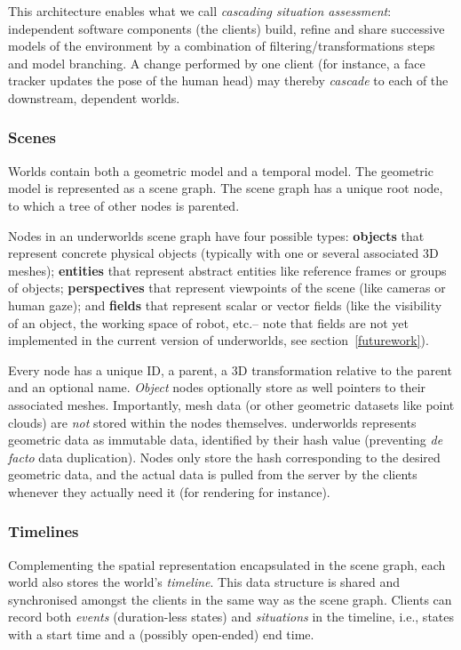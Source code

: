\documentclass[letterpaper, 10pt, conference]{ieeeconf}
\newcommand{\ie}{i.e.,\xspace}
\newcommand{\etc}{etc.\xspace}
\newcommand{\uwds}{{\sc underworlds}\xspace}
\begin{document}
This architecture enables what we call \emph{cascading situation assessment}:
independent software components (the clients) build, refine and share
successive models of the environment by a combination of
filtering/transformations steps and model branching. A change performed by one
client (for instance, a face tracker updates the pose of the human head) may
thereby \emph{cascade} to each of the downstream, dependent worlds.

\subsubsection{Scenes}

Worlds contain both a geometric model and a temporal model. The geometric
model is represented as a scene graph. The scene graph has a unique root node,
to which a tree of other nodes is parented.

Nodes in an \uwds scene graph have four possible types: \textbf{objects} that
represent concrete physical objects (typically with one or several associated 3D
meshes); \textbf{entities} that represent abstract entities like reference
frames or groups of objects; \textbf{perspectives} that represent viewpoints
of the scene (like cameras or human gaze); and \textbf{fields} that represent
scalar or vector fields (like the visibility of an object, the working space of
robot, \etc -- note that fields are not yet implemented in the current version
of \uwds, see section~\ref{futurework}).

Every node has a unique ID, a parent, a 3D transformation relative to the parent
and an optional name. \emph{Object} nodes optionally store as well pointers to
their associated meshes. Importantly, mesh data (or other geometric datasets
like point clouds) are \emph{not} stored within the nodes themselves. \uwds
represents geometric data as immutable data, identified by their hash value
(preventing \textit{de facto} data duplication).  Nodes only store the hash
corresponding to the desired geometric data, and the actual data is pulled from
the server by the clients whenever they actually need it (for rendering for
instance).

\subsubsection{Timelines}

Complementing the spatial representation encapsulated in the scene graph, each
world also stores the world's \emph{timeline}. This data structure is shared
and synchronised amongst the clients in the same way as the scene graph.
Clients can record both \emph{events} (duration-less states) and
\emph{situations} in the timeline, \ie states with a start time and a (possibly open-ended) end time.
\end{document}
